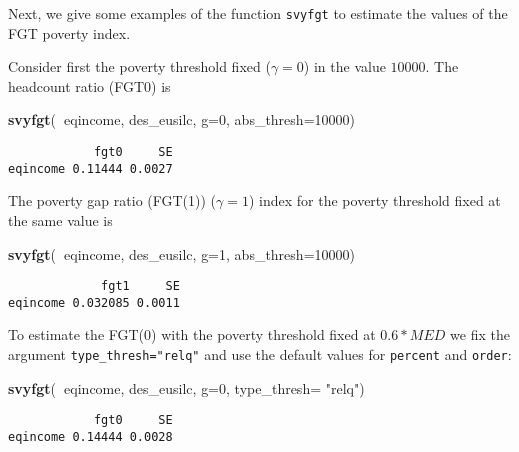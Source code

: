 \documentclass[]{book}
\newenvironment{Shaded}{\begin{snugshade}}{\end{snugshade}}
\newcommand{\DataTypeTok}[1]{\textcolor[rgb]{0.13,0.29,0.53}{#1}}
\newcommand{\DecValTok}[1]{\textcolor[rgb]{0.00,0.00,0.81}{#1}}
\newcommand{\KeywordTok}[1]{\textcolor[rgb]{0.13,0.29,0.53}{\textbf{#1}}}
\newcommand{\NormalTok}[1]{#1}
\newcommand{\OperatorTok}[1]{\textcolor[rgb]{0.81,0.36,0.00}{\textbf{#1}}}
\newcommand{\StringTok}[1]{\textcolor[rgb]{0.31,0.60,0.02}{#1}}
\begin{document}
Next, we give some examples of the function \texttt{svyfgt} to estimate the values of the FGT poverty index.

Consider first the poverty threshold fixed (\(\gamma=0\)) in the value \(10000\). The headcount ratio (FGT0) is

\begin{Shaded}
\begin{Highlighting}[]
\KeywordTok{svyfgt}\NormalTok{(}\OperatorTok{~}\NormalTok{eqincome, des_eusilc, }\DataTypeTok{g=}\DecValTok{0}\NormalTok{, }\DataTypeTok{abs_thresh=}\DecValTok{10000}\NormalTok{)}
\end{Highlighting}
\end{Shaded}

\begin{verbatim}
            fgt0     SE
eqincome 0.11444 0.0027
\end{verbatim}

The poverty gap ratio (FGT(1)) (\(\gamma=1\)) index for the poverty threshold fixed at the same value is

\begin{Shaded}
\begin{Highlighting}[]
\KeywordTok{svyfgt}\NormalTok{(}\OperatorTok{~}\NormalTok{eqincome, des_eusilc, }\DataTypeTok{g=}\DecValTok{1}\NormalTok{, }\DataTypeTok{abs_thresh=}\DecValTok{10000}\NormalTok{)}
\end{Highlighting}
\end{Shaded}

\begin{verbatim}
             fgt1     SE
eqincome 0.032085 0.0011
\end{verbatim}

To estimate the FGT(0) with the poverty threshold fixed at \(0.6* MED\) we fix the argument \texttt{type\_thresh="relq"} and use the default values for \texttt{percent} and \texttt{order}:

\begin{Shaded}
\begin{Highlighting}[]
\KeywordTok{svyfgt}\NormalTok{(}\OperatorTok{~}\NormalTok{eqincome, des_eusilc, }\DataTypeTok{g=}\DecValTok{0}\NormalTok{, }\DataTypeTok{type_thresh=} \StringTok{"relq"}\NormalTok{)}
\end{Highlighting}
\end{Shaded}

\begin{verbatim}
            fgt0     SE
eqincome 0.14444 0.0028
\end{verbatim}
\end{document}
